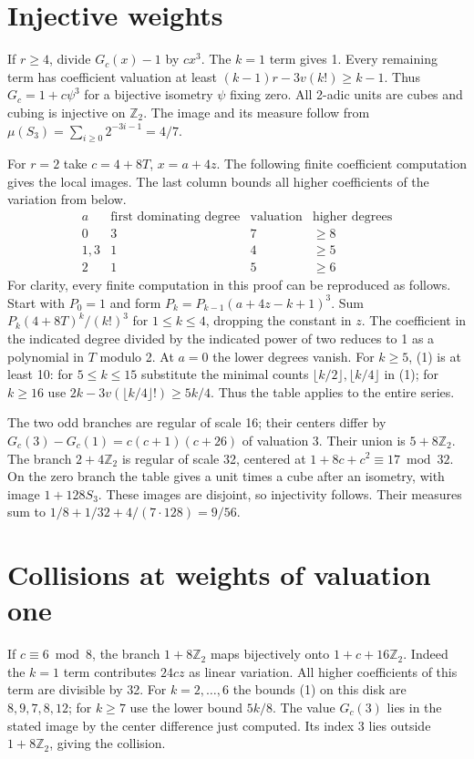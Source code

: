 \documentclass[11pt]{article}
\newcommand{\Z}{\mathbb Z_2}
\begin{document}
\section{Injective weights}
If $r\ge4$, divide $G_c(x)-1$ by $cx^3$. The $k=1$ term gives 1. Every remaining term has coefficient valuation at least $(k-1)r-3v(k!)\ge k-1$. Thus $G_c=1+c\psi^3$ for a bijective isometry $\psi$ fixing zero. All 2-adic units are cubes and cubing is injective on $\Z$. The image and its measure follow from $\mu(S_3)=\sum_{i\ge0}2^{-3i-1}=4/7$.

For $r=2$ take $c=4+8T$, $x=a+4z$. The following finite coefficient computation gives the local images. The last column bounds all higher coefficients of the variation from below.
\[
\begin{array}{c|c|c|c}
 a &\text{first dominating degree}&\text{valuation}&\text{higher degrees}\\\hline
0&3&7&\ge8\\
1,3&1&4&\ge5\\
2&1&5&\ge6
\end{array}
\]
For clarity, every finite computation in this proof can be reproduced as follows. Start with $P_0=1$ and form $P_k=P_{k-1}(a+4z-k+1)^3$. Sum $P_k(4+8T)^k/(k!)^3$ for $1\le k\le4$, dropping the constant in $z$. The coefficient in the indicated degree divided by the indicated power of two reduces to 1 as a polynomial in $T$ modulo 2. At $a=0$ the lower degrees vanish. For $k\ge5$, (1) is at least 10: for $5\le k\le15$ substitute the minimal counts $\lfloor k/2\rfloor,\lfloor k/4\rfloor$ in (1); for $k\ge16$ use $2k-3v(\lfloor k/4\rfloor!)\ge 5k/4$. Thus the table applies to the entire series.

The two odd branches are regular of scale 16; their centers differ by $G_c(3)-G_c(1)=c(c+1)(c+26)$ of valuation 3. Their union is $5+8\Z$. The branch $2+4\Z$ is regular of scale 32, centered at $1+8c+c^2\equiv17\bmod32$. On the zero branch the table gives a unit times a cube after an isometry, with image $1+128S_3$. These images are disjoint, so injectivity follows. Their measures sum to $1/8+1/32+4/(7\cdot128)=9/56$.

\section{Collisions at weights of valuation one}
If $c\equiv6\bmod8$, the branch $1+8\Z$ maps bijectively onto $1+c+16\Z$. Indeed the $k=1$ term contributes $24cz$ as linear variation. All higher coefficients of this term are divisible by 32. For $k=2,\ldots,6$ the bounds (1) on this disk are $8,9,7,8,12$; for $k\ge7$ use the lower bound $5k/8$. The value $G_c(3)$ lies in the stated image by the center difference just computed. Its index 3 lies outside $1+8\Z$, giving the collision.
\end{document}

